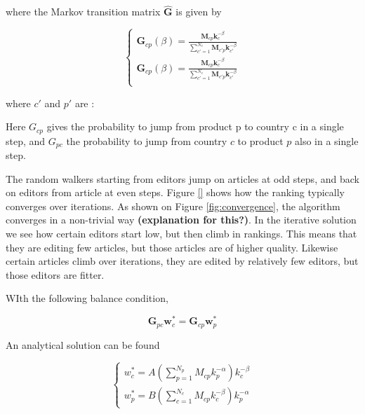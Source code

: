 where the Markov transition matrix $\mathbf{\hat{G}}$ is given by 

\begin{equation}
\begin{cases}
\mathbf{G}_{cp}(\beta) = \frac{\mathbf{M}_{cp} \mathbf{k}_{c}^{-\beta}}{\sum_{c' = 1}^{N_c} \mathbf{M}_{c'p} \mathbf{k}_{c'}^{-\beta}}\\
\mathbf{G}_{cp}(\beta) = \frac{\mathbf{M}_{cp} \mathbf{k}_{c}^{-\beta}}{\sum_{c' = 1}^{N_c} \mathbf{M}_{c'p} \mathbf{k}_{c'}^{-\beta}}\\
 \end{cases}
\end{equation}

where $c'$ and $p'$ are :

Here $G_{cp}$ gives the probability to jump from product p to country c
in a single step, and $G_{pc}$ the probability to jump from country $c$ to
product $p$ also in a single step.


The random walkers starting from editors jump on articles at odd steps, and back on editors from article at even steps. Figure \ref{} shows how the ranking typically converges over iterations. As shown on Figure \ref{fig:convergence}, the algorithm converges in a non-trivial way {\bf (explanation for this?)}. In the iterative solution we see how certain editors start low, but then climb in rankings. This means that they are editing few articles, but those articles are of higher quality. Likewise certain articles climb over iterations, they are edited by relatively few editors, but those editors are fitter.

WIth the following balance condition,

\begin{equation}
\mathbf{G}_{pc} \mathbf{w}^*_c = \mathbf{G}_{cp} \mathbf{w}^*_p
\end{equation}

An analytical solution can be found \cite{caldarelli}

\begin{equation}
\begin{cases}
 w^*_c = A(\sum^{N_p}_{p=1} M_{cp}k_p^{-\alpha})k_c^{-\beta} \\
w^*_p = B(\sum^{N_c}_{c=1} M_{cp}k_c^{-\beta})k_p^{-\alpha}
\end{cases}
\end{equation}





